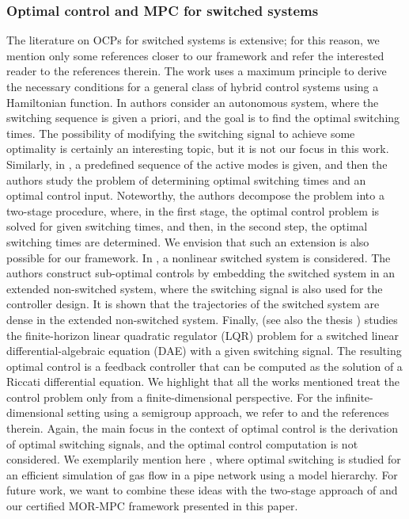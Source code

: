 \documentclass[reqno]{amsart}
\newcommand{\abbr}[1]{\textsf{#1}\xspace}
\newcommand{\DAE}{\abbr{DAE}}
\newcommand{\MPC}{\abbr{MPC}}
\newcommand{\MOR}{\abbr{MOR}}
\newcommand{\LQR}{\abbr{LQR}}
\newcommand{\OCPs}{\abbr{OCPs}}
\begin{document}
\subsubsection{Optimal control and \texorpdfstring{\MPC}{MPC} for switched systems}
The literature on \OCPs for switched systems is extensive; for this reason, we mention only some references closer to our framework and refer the interested reader to the references therein. The work \cite{RieKUZ99} uses a maximum principle to derive the necessary conditions for a general class of hybrid control systems using a Hamiltonian function. In
\cite{GiuSV01} authors consider an autonomous system, where the switching sequence is given a priori, and the goal is to find the optimal switching times. The possibility of modifying the switching signal to achieve some optimality is certainly an interesting topic, but it is not our focus in this work. Similarly, in \cite{XuA04}, a predefined sequence of the active modes is given, and then the authors study the problem of determining optimal switching times and an optimal control input. Noteworthy, the authors decompose the problem into a two-stage procedure, where, in the first stage, the optimal control problem is solved for given switching times, and then, in the second step, the optimal switching times are determined. We envision that such an extension is also possible for our framework. In \cite{BenD05}, a nonlinear switched system is considered. The authors construct sub-optimal controls by embedding the switched system in an extended non-switched system, where the switching signal is also used for the controller design. It is shown that the trajectories of the switched system are dense in the extended non-switched system. Finally, \cite{WijT23} (see also the thesis \cite{Wij22}) studies the finite-horizon linear quadratic regulator (\LQR) problem for a switched linear differential-algebraic equation (\DAE) with a given switching signal. The resulting optimal control is a feedback controller that can be computed as the solution of a Riccati differential equation. We highlight that all the works mentioned treat the control problem only from a finite-dimensional perspective. For the infinite-dimensional setting using a semigroup approach, we refer to \cite{Han18} and the references therein. Again, the main focus in the context of optimal control is the derivation of optimal switching signals, and the optimal control computation is not considered. We exemplarily mention here \cite{RueH16,RueH17,RueMH18}, where optimal switching is studied for an efficient simulation of gas flow in a pipe network using a model hierarchy. For future work, we want to combine these ideas with the two-stage approach of \cite{XuA04} and our certified \MOR-\MPC framework presented in this paper.
\end{document}
